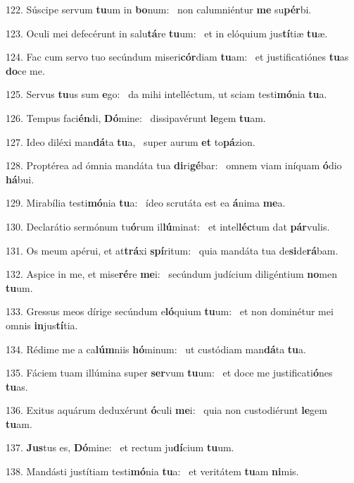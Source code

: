 122. Súscipe servum \textbf{tu}um in \textbf{bo}num: \ast\  non calumniéntur \textbf{me} su\textbf{pér}bi.\

123. Oculi mei defecérunt in salu\textbf{tá}re \textbf{tu}um: \ast\  et in elóquium jus\textbf{tí}tiæ \textbf{tu}æ.\

124. Fac cum servo tuo secúndum miseri\textbf{cór}diam \textbf{tu}am: \ast\  et justificatiónes \textbf{tu}as \textbf{do}ce me.\

125. Servus \textbf{tu}us sum \textbf{e}go: \ast\  da mihi intelléctum, ut sciam testi\textbf{mó}nia \textbf{tu}a.\

126. Tempus faci\textbf{én}di, \textbf{Dó}mine: \ast\  dissipavérunt \textbf{le}gem \textbf{tu}am.\

127. Ideo diléxi man\textbf{dá}ta \textbf{tu}a, \ast\  super aurum \textbf{et} to\textbf{pá}zion.\

128. Proptérea ad ómnia mandáta tua \textbf{di}ri\textbf{gé}bar: \ast\  omnem viam iníquam \textbf{ó}dio \textbf{há}bui.\

129. Mirabília testi\textbf{mó}nia \textbf{tu}a: \ast\  ídeo scrutáta est ea \textbf{á}nima \textbf{me}a.\

130. Declarátio sermónum tu\textbf{ó}rum il\textbf{lú}minat: \ast\  et intel\textbf{léc}tum dat \textbf{pár}vulis.\

131. Os meum apérui, et at\textbf{trá}xi \textbf{spí}ritum: \ast\  quia mandáta tua de\textbf{si}de\textbf{rá}bam.\

132. Aspice in me, et mise\textbf{ré}re \textbf{me}i: \ast\  secúndum judícium diligéntium \textbf{no}men \textbf{tu}um.\

133. Gressus meos dírige secúndum e\textbf{ló}quium \textbf{tu}um: \ast\  et non dominétur mei omnis \textbf{in}jus\textbf{tí}tia.\

134. Rédime me a ca\textbf{lúm}niis \textbf{hó}minum: \ast\  ut custódiam man\textbf{dá}ta \textbf{tu}a.\

135. Fáciem tuam illúmina super \textbf{ser}vum \textbf{tu}um: \ast\  et doce me justificati\textbf{ó}nes \textbf{tu}as.\

136. Exitus aquárum deduxérunt \textbf{ó}culi \textbf{me}i: \ast\  quia non custodiérunt \textbf{le}gem \textbf{tu}am.\

137. \textbf{Jus}tus es, \textbf{Dó}mine: \ast\  et rectum ju\textbf{dí}cium \textbf{tu}um.\

138. Mandásti justítiam testi\textbf{mó}nia \textbf{tu}a: \ast\  et veritátem \textbf{tu}am \textbf{ni}mis.\

